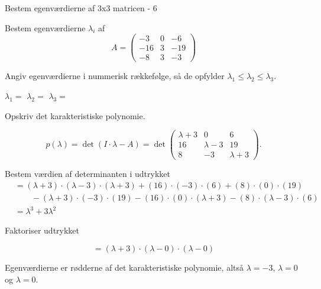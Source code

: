\documentclass{article}
\begin{document}
\begin{exercise}{Bestem egenværdierne af 3x3 matricen - 6}

Bestem egenværdierne $\lambda_i$ af 
\[
A=\begin{pmatrix}
-3 & 0 & -6 \\
-16 & 3 & -19 \\
-8 & 3 & -3
\end{pmatrix}
\]

Angiv egenværdierne i nummerisk rækkefølge, så de
opfylder $\lambda_1 \le \lambda_2 \le \lambda_3$.

$\lambda_1 = $
$\lambda_2 = $
$\lambda_3 = $

\hint
Opskriv det karakteristiske polynomie.

\hint
\[
p(\lambda)=\det\left(I \cdot \lambda - A \right)=\det\begin{pmatrix}
\lambda + 3 & 0 & 6 \\
16 & \lambda - 3 & 19 \\
8 & -3 & \lambda+3
\end{pmatrix}.
\]

\hint
Bestem værdien af determinanten i udtrykket
\begin{align*}
&=(\lambda+3) \cdot (\lambda-3) \cdot (\lambda+3)+(16) \cdot (-3) \cdot (6)+(8) \cdot (0) \cdot (19) \\
& \qquad -(\lambda+3) \cdot (-3) \cdot (19)-(16) \cdot (0) \cdot (\lambda+3)-(8) \cdot (\lambda-3) \cdot (6) \\
&=\lambda^3+3\lambda^2
\end{align*}

\hint
Faktoriser udtrykket

\hint
\[
=(\lambda+3) \cdot (\lambda-0) \cdot (\lambda-0)
\]

\hint
Egenværdierne er rødderne af det karakteristiske polynomie, 
altså
$\lambda=-3$, $\lambda=0$ og $\lambda=0$.

\end{exercise}
\end{document}
